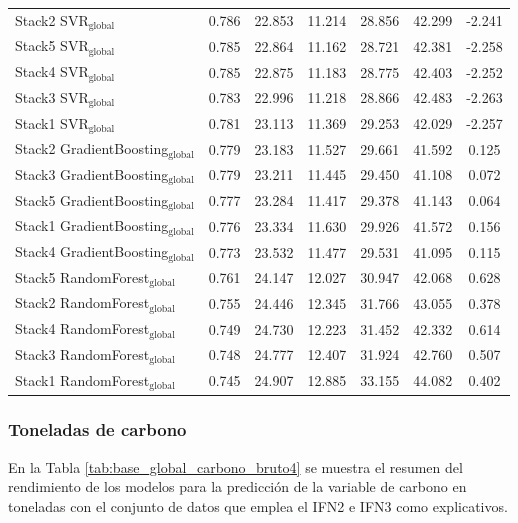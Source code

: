 \begin{table}
{\begin{tabular}{p{4.5cm}cccccc}
    Stack2 SVR$_{\text{global}}$ & 0.786 & 22.853 & 11.214 & 28.856 & 42.299 & -2.241 \\
    Stack5 SVR$_{\text{global}}$ & 0.785 & 22.864 & 11.162 & 28.721 & 42.381 & -2.258 \\
    Stack4 SVR$_{\text{global}}$ & 0.785 & 22.875 & 11.183 & 28.775 & 42.403 & -2.252 \\
    Stack3 SVR$_{\text{global}}$ & 0.783 & 22.996 & 11.218 & 28.866 & 42.483 & -2.263 \\
    Stack1 SVR$_{\text{global}}$ & 0.781 & 23.113 & 11.369 & 29.253 & 42.029 & -2.257 \\
    Stack2 GradientBoosting$_{\text{global}}$ & 0.779 & 23.183 & 11.527 & 29.661 & 41.592 & 0.125 \\
    Stack3 GradientBoosting$_{\text{global}}$ & 0.779 & 23.211 & 11.445 & 29.450 & 41.108 & 0.072 \\
    Stack5 GradientBoosting$_{\text{global}}$ & 0.777 & 23.284 & 11.417 & 29.378 & 41.143 & 0.064 \\
    Stack1 GradientBoosting$_{\text{global}}$ & 0.776 & 23.334 & 11.630 & 29.926 & 41.572 & 0.156 \\
    Stack4 GradientBoosting$_{\text{global}}$ & 0.773 & 23.532 & 11.477 & 29.531 & 41.095 & 0.115 \\
    Stack5 RandomForest$_{\text{global}}$ & 0.761 & 24.147 & 12.027 & 30.947 & 42.068 & 0.628 \\
    Stack2 RandomForest$_{\text{global}}$ & 0.755 & 24.446 & 12.345 & 31.766 & 43.055 & 0.378 \\
    Stack4 RandomForest$_{\text{global}}$ & 0.749 & 24.730 & 12.223 & 31.452 & 42.332 & 0.614 \\
    Stack3 RandomForest$_{\text{global}}$ & 0.748 & 24.777 & 12.407 & 31.924 & 42.760 & 0.507 \\
    Stack1 RandomForest$_{\text{global}}$ & 0.745 & 24.907 & 12.885 & 33.155 & 44.082 & 0.402 \\
            \bottomrule
    \end{tabular}
    }
\end{table}


\subsubsection{Toneladas de carbono}


En la Tabla \ref{tab:base_global_carbono_bruto4} se muestra el resumen del rendimiento de los modelos para la predicción de la variable de carbono en toneladas con el conjunto de datos que emplea el IFN2 e IFN3 como explicativos.


